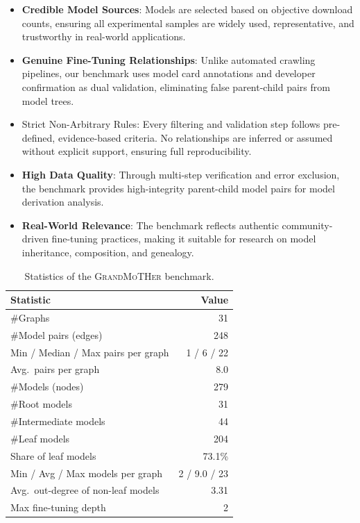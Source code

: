 \begin{itemize}
    \item \textbf{Credible Model Sources}: Models are selected based on objective download counts, ensuring all experimental samples are widely used, representative, and trustworthy in real-world applications.
    
    \item \textbf{Genuine Fine-Tuning Relationships}: Unlike automated crawling pipelines, our benchmark uses model card annotations and developer confirmation as dual validation, eliminating false parent-child pairs from model trees.
    
    \item{Strict Non-Arbitrary Rules}: Every filtering and validation step follows pre-defined, evidence-based criteria. No relationships are inferred or assumed without explicit support, ensuring full reproducibility.
    
    \item \textbf{High Data Quality}: Through multi-step verification and error exclusion, the benchmark provides high-integrity parent-child model pairs for model derivation analysis.
    
    \item \textbf{Real-World Relevance}: The benchmark reflects authentic community-driven fine-tuning practices, making it suitable for research on model inheritance, composition, and genealogy.
\end{itemize}

\begin{table}[t]
    \centering
    \caption{Statistics of the \textsc{GrandMoTHer} benchmark.}
    \label{tab:grandmother-statistics}
    \small
    \begin{tabular}{l r}
        \toprule
        \textbf{Statistic} & \textbf{Value} \\
        \midrule
        \#Graphs & 31 \\
        \#Model pairs (edges) & 248 \\
        Min / Median / Max pairs per graph & 1 / 6 / 22 \\
        Avg.\ pairs per graph & 8.0 \\
        \#Models (nodes) & 279 \\
        \#Root models & 31 \\
        \#Intermediate models & 44 \\
        \#Leaf models & 204 \\
        Share of leaf models & 73.1\% \\
        Min / Avg / Max models per graph & 2 / 9.0 / 23 \\
        Avg.\ out-degree of non-leaf models & 3.31 \\
        Max fine-tuning depth & 2 \\
        \bottomrule
    \end{tabular}
\end{table}
